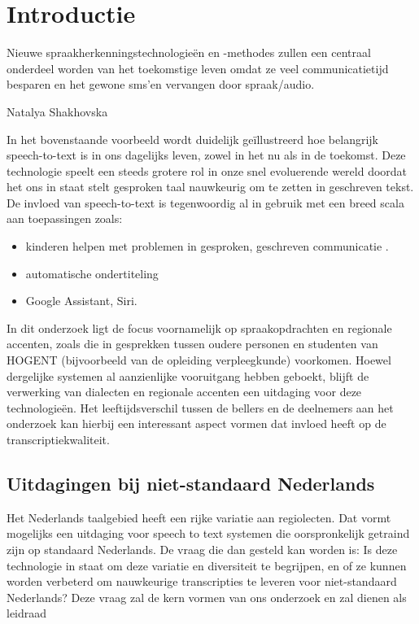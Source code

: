 \section{Introductie}%
\label{sec:introductie}
\epigraph{Nieuwe spraakherkenningstechnologieën en -methodes zullen een centraal onderdeel worden van het toekomstige leven omdat ze veel communicatietijd besparen en het gewone sms'en vervangen door spraak/audio.}{Natalya Shakhovska}

In het bovenstaande voorbeeld wordt duidelijk geïllustreerd hoe belangrijk speech-to-text is in ons dagelijks leven, zowel in het nu als in de toekomst. Deze technologie speelt een steeds grotere rol in onze snel evoluerende wereld doordat het ons in staat stelt gesproken taal nauwkeurig om te zetten in geschreven tekst. De invloed van speech-to-text is tegenwoordig al in gebruik met een breed scala aan toepassingen zoals:
\begin{itemize}
    \item kinderen helpen met problemen in gesproken, geschreven communicatie \autocite{Kambouri2023}.
    \item automatische ondertiteling
    \item Google Assistant, Siri.
\end{itemize}

In dit onderzoek ligt de focus voornamelijk op spraakopdrachten en regionale accenten, zoals die in gesprekken tussen oudere personen en studenten van HOGENT (bijvoorbeeld van de opleiding verpleegkunde) voorkomen. Hoewel dergelijke systemen al aanzienlijke vooruitgang hebben geboekt, blijft de verwerking van dialecten en regionale accenten een uitdaging voor deze technologieën. Het leeftijdsverschil tussen de bellers en de deelnemers aan het onderzoek kan hierbij een interessant aspect vormen dat invloed heeft op de transcriptiekwaliteit.

\subsection{Uitdagingen bij niet-standaard Nederlands}
Het Nederlands taalgebied heeft een rijke variatie aan regiolecten. Dat vormt mogelijks een uitdaging voor speech to text systemen die oorspronkelijk getraind zijn op standaard Nederlands. De vraag die dan gesteld kan worden is: Is deze technologie in staat om deze variatie en diversiteit te begrijpen, en of ze kunnen worden verbeterd om nauwkeurige transcripties te leveren voor niet-standaard Nederlands?
Deze vraag zal de kern vormen van ons onderzoek en zal dienen als leidraad

